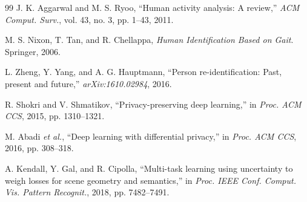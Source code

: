 ﻿\documentclass[UTF8,twocolumn]{ctexart}
\begin{document}
{\begin{thebibliography}{99}
J. K. Aggarwal and M. S. Ryoo, ``Human activity analysis: A review,'' \emph{ACM Comput. Surv.}, vol. 43, no. 3, pp. 1--43, 2011.

M. S. Nixon, T. Tan, and R. Chellappa, \emph{Human Identification Based on Gait}. Springer, 2006.

L. Zheng, Y. Yang, and A. G. Hauptmann, ``Person re-identification: Past, present and future,'' \emph{arXiv:1610.02984}, 2016.

R. Shokri and V. Shmatikov, ``Privacy-preserving deep learning,'' in \emph{Proc. ACM CCS}, 2015, pp. 1310--1321.

M. Abadi \emph{et al.}, ``Deep learning with differential privacy,'' in \emph{Proc. ACM CCS}, 2016, pp. 308--318.

A. Kendall, Y. Gal, and R. Cipolla, ``Multi-task learning using uncertainty to weigh losses for scene geometry and semantics,'' in \emph{Proc. IEEE Conf. Comput. Vis. Pattern Recognit.}, 2018, pp. 7482--7491.

\end{thebibliography}
}
\end{document}
